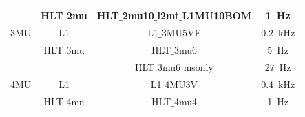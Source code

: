 \begin{table}[]
\begin{tabular}{|c|c|c|c|}
        \hline
            & HLT 2mu & HLT$\_$2mu10$\_$l2mt$\_$L1MU10BOM & 1~Hz\\
        \hline
        \hline
        3MU &L1 & L1$\_$3MU5VF & 0.2~kHz\\
        \hline
            &HLT 3mu & HLT$\_$3mu6 & 5~Hz\\
            &        &HLT$\_$3mu6$\_$msonly &27~Hz\\
        \hline
        \hline
        4MU & L1 & L1$\_$4MU3V & 0.4~kHz\\
        \hline
            & HLT 4mu & HLT$\_$4mu4 & 1~Hz\\
        \hline
    \end{tabular}
\end{table}



